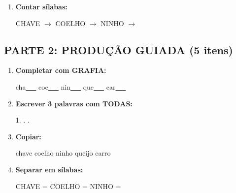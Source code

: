 \begin{exercicio}
\begin{enumerate}
  \item \textbf{Contar sílabas:}
  \begin{center}
  CHAVE $\rightarrow$ \underline{\hspace{0.9cm}} \quad COELHO $\rightarrow$ \underline{\hspace{0.9cm}} \quad NINHO $\rightarrow$ \underline{\hspace{0.9cm}}
  \end{center}

\end{enumerate}

\subsection*{PARTE 2: PRODUÇÃO GUIADA (5 itens)}

\begin{enumerate}[resume]

  \item \textbf{Completar com GRAFIA:}
  \begin{center}
  cha\underline{~~~} \quad coe\underline{~~~} \quad nin\underline{~~~} \quad que\underline{~~~} \quad car\underline{~~~}
  \end{center}

  \item \textbf{Escrever 3 palavras com TODAS:}
  \begin{center}
  1. \underline{\hspace{3cm}} . \underline{\hspace{3cm}} . \underline{\hspace{3cm}}
  \end{center}

  \item \textbf{Copiar:}
  \begin{center}
  chave \quad coelho \quad ninho \quad queijo \quad carro
  \end{center}

  \item \textbf{Separar em sílabas:}
  \begin{center}
  CHAVE = \underline{\hspace{1cm}} \underline{\hspace{1cm}} \quad COELHO = \underline{\hspace{1cm}} \underline{\hspace{1cm}} \quad NINHO = \underline{\hspace{1cm}} \underline{\hspace{1cm}}
  \end{center}


\end{enumerate}
\end{exercicio}

